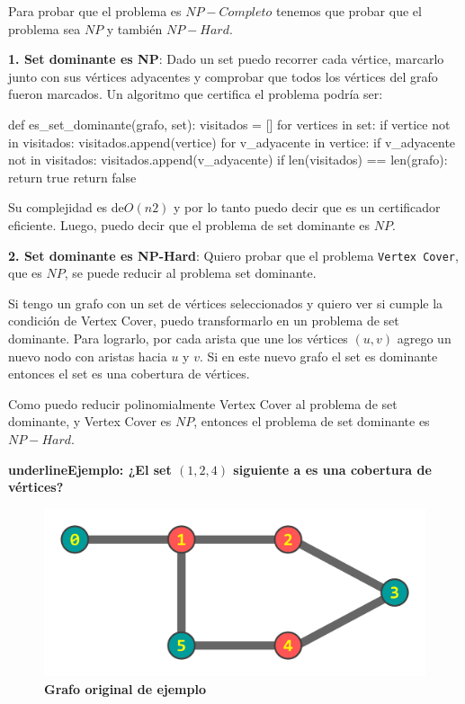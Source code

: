 \documentclass[../tp3_grupo404.tex]{subfiles}
\begin{document}
Para probar que el problema  es $NP-Completo$ tenemos que probar que el problema
sea $NP$ y también $NP-Hard$.

\textbf{1. Set dominante es NP}: Dado un set puedo recorrer cada vértice, marcarlo junto con
sus vértices adyacentes y comprobar que todos los vértices del grafo fueron marcados.
Un algoritmo que certifica el problema podría ser:

\begin{alternate}[breaklines=true,numbers=left,xleftmargin=5mm]
    def es_set_dominante(grafo, set):
    visitados = []
    for vertices in set:
        if vertice not in visitados:
            visitados.append(vertice)
        for v_adyacente in vertice:
            if v_adyacente not in visitados:
                visitados.append(v_adyacente)
    if len(visitados) == len(grafo):
        return true
    return false
\end{alternate}

Su complejidad es de$ O(n2)$ y por lo tanto puedo decir que es un certificador eficiente.
Luego, puedo decir que el problema de set dominante es $NP$.

\textbf{2. Set dominante es NP-Hard}: Quiero probar que el problema \texttt{Vertex Cover},
que es $NP$, se puede reducir al problema set dominante.

Si tengo un grafo con un set de vértices seleccionados y quiero ver si cumple la condición
de Vertex Cover, puedo transformarlo en un problema de set dominante.
Para lograrlo, por cada arista que une los vértices $(u,v)$ agrego un nuevo nodo con aristas
hacia $u$ y $v$. Si en este nuevo grafo el set es dominante entonces el set es una cobertura
de vértices.

Como puedo reducir polinomialmente Vertex Cover al problema de set dominante,
y Vertex Cover es $NP$, entonces el problema de set dominante es $NP-Hard$.

\textbf{underline{Ejemplo:} ¿El set $(1,2,4)$ siguiente a es una cobertura de vértices?}

\begin{figure}[H]
    \centering
    \includegraphics[width=0.9\linewidth,angle=0,origin=c]{out/ejB1.png}
    \caption{\label{ejB1} \textbf{Grafo original de ejemplo}}
\end{figure}
\end{document}
